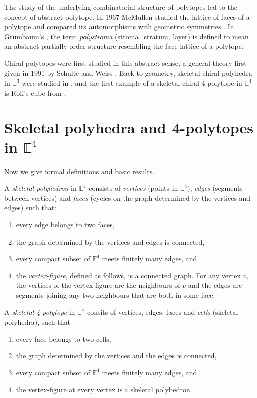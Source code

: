 \documentclass{article}
\theoremstyle{definition}
\newcommand{\E}{\mathbb{E}}
\begin{document}
	The study of the underlying combinatorial structure of polytopes led to the concept of abstract polytope. In 1967 McMullen studied the lattice of faces of a polytope and compared its automorphisms with geometric symmetries \cite{mcmullen-combinatorially}. In Grümbaum's \cite{grunbaum-regularity}, the term \textit{polystroma} (stroma=stratum, layer) is defined to mean an abstract partially order structure resembling the face lattice of a polytope.
	
	Chiral polytopes were first studied in this abstract sense, a general theory first given in 1991 by Schulte and Weiss \cite{schulte-chiral}. Back to geometry, skeletal chiral polyhedra in $\E^3$ were studied in \cite{chiral-polyhedra-i,chiral-polyhedra-ii}, and the first example of a skeletal chiral 4-polytope in $\E^4$ is Roli's cube from \cite{rolis-cube}.
	
	\section{Skeletal polyhedra and 4-polytopes in $\E^4$}\label{sec:skeletal}
	Now we give formal definitions and basic results.
	
	A \textit{skeletal polyhedron} in $\E^4$ consists of \textit{vertices} (points in $\E^4$), \textit{edges} (segments between vertices) and \textit{faces} (cycles on the graph determined by the vertices and edges) such that:
	\begin{enumerate}[\itshape(i)]
		\item every edge belongs to two faces,
		\item the graph determined by the vertices and edges is connected,
		\item every compact subset of $\E^4$ meets finitely many edges, and
		\item the \textit{vertex-figure}, defined as follows, is a connected graph. For any vertex $v$, the vertices of the vertex-figure are the neighbours of $v$ and the edges are segments joining any two neighbours that are both in some face.
	\end{enumerate}
	A \textit{skeletal 4-polytope} in $\E^4$ consits of vertices, edges, faces and \textit{cells} (skeletal polyhedra), such that
	\begin{enumerate}[\itshape(i)]
		\item every face belongs to two cells,
		\item the graph determined by the vertices and the edges is connected,
		\item every compact subset of $\E^4$ meets finitely many edges, and
		\item the vertex-figure at every vertex is a skeletal polyhedron.
		\end{enumerate}
	
\end{document}
